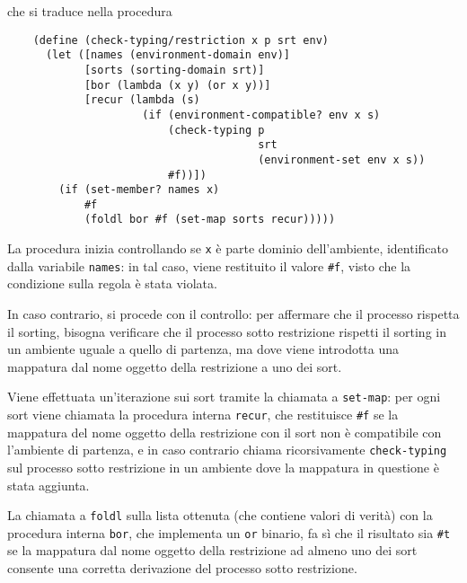 che si traduce nella procedura

\begin{lstlisting}
    (define (check-typing/restriction x p srt env)
      (let ([names (environment-domain env)]
            [sorts (sorting-domain srt)]
            [bor (lambda (x y) (or x y))]
            [recur (lambda (s)
                     (if (environment-compatible? env x s)
                         (check-typing p
                                       srt
                                       (environment-set env x s))
                         #f))])
        (if (set-member? names x)
            #f
            (foldl bor #f (set-map sorts recur)))))
\end{lstlisting}

La procedura inizia controllando se \lstinline{x} \`e parte dominio
dell'ambiente, identificato dalla variabile \lstinline{names}: in tal
caso, viene restituito il valore \lstinline{#f}, visto che la condizione
sulla regola \`e stata violata.

In caso contrario, si procede con il controllo: per affermare che il
processo rispetta il sorting, bisogna verificare che il processo sotto
restrizione rispetti il sorting in un ambiente uguale a quello di
partenza, ma dove viene introdotta una mappatura dal nome oggetto
della restrizione a uno dei sort.

Viene effettuata un'iterazione sui sort tramite la chiamata a
\lstinline{set-map}: per ogni sort viene chiamata la procedura
interna \lstinline{recur}, che restituisce \lstinline{#f} se la
mappatura del nome oggetto della restrizione con il sort non \`e
compatibile con l'ambiente di partenza, e in caso contrario chiama
ricorsivamente \lstinline{check-typing} sul processo sotto restrizione
in un ambiente dove la mappatura in questione \`e stata aggiunta.

La chiamata a \lstinline{foldl} sulla lista ottenuta (che contiene
valori di verit\`a) con la procedura interna \lstinline{bor}, che
implementa un \lstinline{or} binario, fa s\`i che il risultato sia
\lstinline{#t} se la mappatura dal nome oggetto della restrizione ad
almeno uno dei sort consente una corretta derivazione del processo
sotto restrizione.
